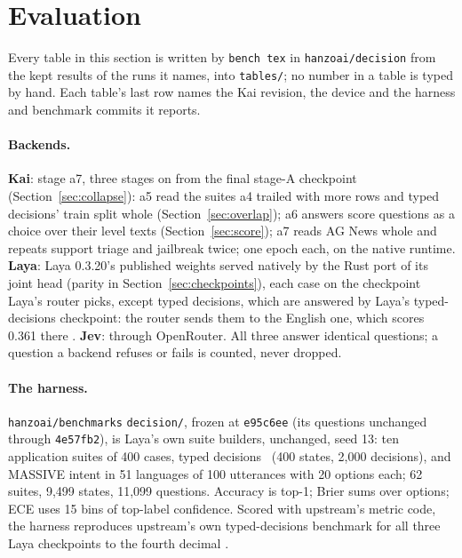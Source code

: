\section{Evaluation}
\label{sec:evaluation}

Every table in this section is written by \texttt{bench tex} in
\texttt{hanzoai/decision} from the kept results of the runs it names, into
\texttt{tables/}; no number in a table is typed by hand. Each table's last row
names the Kai revision, the device and the harness and benchmark commits it
reports.

\paragraph{Backends.}
\textbf{Kai}: stage a7, three stages on from the final stage-A checkpoint
(Section~\ref{sec:collapse}): a5 read the suites a4 trailed with more rows and
typed decisions' train split whole (Section~\ref{sec:overlap}); a6 answers
score questions as a choice over their level texts (Section~\ref{sec:score});
a7 reads AG News whole and repeats support triage and jailbreak twice; one
epoch each, on the native runtime. \textbf{Laya}: Laya 0.3.20's published weights served natively
by the Rust port of its joint head (parity in Section~\ref{sec:checkpoints}),
each case on the checkpoint Laya's router picks, except typed decisions, which
are answered by Laya's typed-decisions checkpoint: the router sends them to the
English one, which scores 0.361 there \meas. \textbf{Jev}:
 through OpenRouter. All three answer identical questions;
a question a backend refuses or fails is counted, never dropped.

\paragraph{The harness.}
\texttt{hanzoai/benchmarks} \texttt{decision/}, frozen at \texttt{e95c6ee}
(its questions unchanged through \texttt{4e57fb2}), is Laya's own suite
builders, unchanged, seed 13: ten application suites of 400 cases, typed
decisions~\cite{typeddecisions} (400 states, 2{,}000 decisions), and MASSIVE
intent in 51 languages of 100 utterances with 20 options each; 62 suites,
9{,}499 states, 11{,}099 questions. Accuracy is top-1; Brier sums over options;
ECE uses 15 bins of top-label confidence. Scored with upstream's metric code,
the harness reproduces upstream's own typed-decisions benchmark for all three
Laya checkpoints to the fourth decimal \meas.


